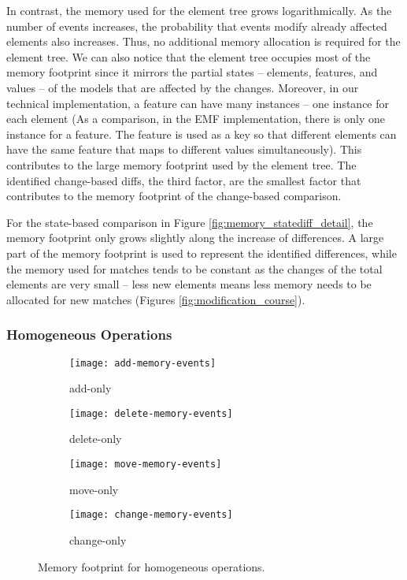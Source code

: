 In contrast, the memory used for the element tree grows logarithmically. As the number of events increases, the probability that events modify already affected elements also increases. Thus, no additional memory allocation is required for the element tree. We can also notice that the element tree occupies most of the memory footprint since it mirrors the partial states -- elements, features, and values -- of the models that are affected by the changes. Moreover, in our technical implementation, a feature can have many instances -- one instance for each element (As a comparison, in the EMF implementation, there is only one instance for a feature. The feature is used as a key so that different elements can have the same feature that maps to different values simultaneously). This contributes to the large memory footprint used by the element tree. The identified change-based diffs, the third factor, are the smallest factor that contributes to the memory footprint of the change-based comparison. 

For the state-based comparison in Figure \ref{fig:memory_statediff_detail}, the memory footprint only grows slightly along the increase of differences. A large part of the memory footprint is used to represent the identified differences, while the memory used for matches tends to be constant as the changes of the total elements are very small -- less new elements means less memory needs to be allocated for new matches (Figures \ref{fig:modification_course}). 

\subsubsection{Homogeneous Operations}
\label{sec:homogeneous-operation}



\begin{figure}[ht]
    \centering
    \begin{subfigure}[t]{0.495\linewidth}
        \texttt{[image: add-memory-events]}
        \caption{add-only}
        \label{fig:add-memory-events}
    \end{subfigure}
    \hfill
    \begin{subfigure}[t]{0.495\linewidth}
        \texttt{[image: delete-memory-events]}
        \caption{delete-only}
        \label{fig:delete-memory-events}
    \end{subfigure}
    \begin{subfigure}[t]{0.495\linewidth}
        \texttt{[image: move-memory-events]}
        \caption{move-only}
        \label{fig:move-memory-events}
    \end{subfigure}
    \hfill
    \begin{subfigure}[t]{0.495\linewidth}
        \texttt{[image: change-memory-events]}
        \caption{change-only}
        \label{fig:change-memory-events}
    \end{subfigure}
    \caption{Memory footprint for homogeneous operations.}
    \label{fig:operation_memory_events}
\end{figure}

